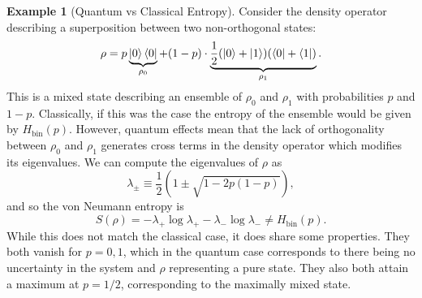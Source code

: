 \documentclass[12pt,a4paper]{report}
\numberwithin{equation}{section}
\newcommand{\ketbra}[2]{\ket{#1}\bra{#2}}
\newcommand{\ketbras}[1]{\ketbra{#1}{#1}}
\theoremstyle{definition}
\theoremstyle{theorem}
\theoremstyle{theorem}
\theoremstyle{example}
\newtheorem{example}{Example}[section]
\theoremstyle{definition}
\begin{document}
\begin{example}[Quantum vs Classical Entropy]
	Consider the density operator describing a superposition between two non-orthogonal states:
	\begin{equation}
		\rho=p\underbrace{\ketbras{0}}_{\rho_{0}}+(1-p)\cdot\underbrace{\frac{1}{2}(\ket{0}+\ket{1})(\bra{0}+\bra{1})}_{\rho_{1}}.
	\end{equation}
	This is a mixed state describing an ensemble of $\rho_{0}$ and $\rho_{1}$ with probabilities $p$ and $1-p$. Classically, if this was the case the entropy of the ensemble would be given by $H_{\text{bin}}(p)$. However, quantum effects mean that the lack of orthogonality between $\rho_{0}$ and $\rho_{1}$ generates cross terms in the density operator which modifies its eigenvalues. We can compute the eigenvalues of $\rho$ as
	\begin{equation}
		\lambda_{\pm}\equiv\frac{1}{2}\left(1\pm\sqrt{1-2p(1-p)}\right),
	\end{equation}
	and so the von Neumann entropy is
	\begin{equation}
		S(\rho)=-\lambda_{+}\log\lambda_{+}-\lambda_{-}\log\lambda_{-}\neq H_{\text{bin}}(p).
	\end{equation}
	While this does not match the classical case, it does share some properties. They both vanish for $p=0,1$, which in the quantum case corresponds to there being no uncertainty in the system and $\rho$ representing a pure state. They also both attain a maximum at $p=1/2$, corresponding to the maximally mixed state.
\end{example}
\end{document}
